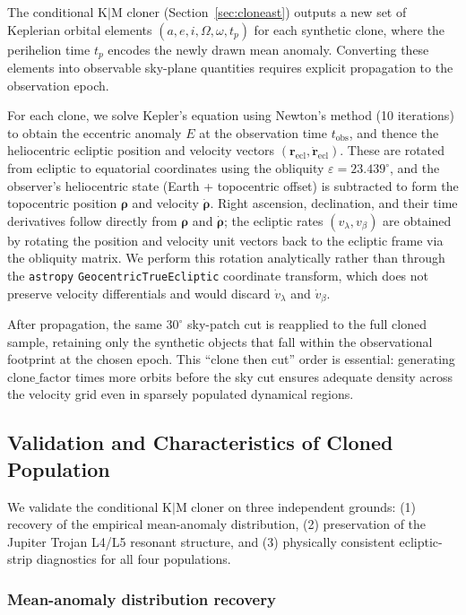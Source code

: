 \documentclass[linenumbers,trackchanges,twocolumn]{aastex701}
\begin{document}
The conditional K$|$M cloner (Section~\ref{sec:cloneast}) outputs a new set of Keplerian orbital elements $(a, e, i, \Omega, \omega, t_p)$ for each synthetic clone, where the perihelion time $t_p$ encodes the newly drawn mean anomaly.
Converting these elements into observable sky-plane quantities requires explicit propagation to the observation epoch.

For each clone, we solve Kepler's equation using Newton's method (10 iterations) to obtain the eccentric anomaly $E$ at the observation time $t_\mathrm{obs}$, and thence the heliocentric ecliptic position and velocity vectors $(\mathbf{r}_\mathrm{ecl}, \dot{\mathbf{r}}_\mathrm{ecl})$.
These are rotated from ecliptic to equatorial coordinates using the obliquity $\varepsilon = 23.439^\circ$, and the observer's heliocentric state (Earth + topocentric offset) is subtracted to form the topocentric position $\mathbf{\rho}$ and velocity $\dot{\mathbf{\rho}}$.
Right ascension, declination, and their time derivatives follow directly from $\mathbf{\rho}$ and $\dot{\mathbf{\rho}}$; the ecliptic rates $(v_\lambda, v_\beta)$ are obtained by rotating the position and velocity unit vectors back to the ecliptic frame via the obliquity matrix.
We perform this rotation analytically rather than through the \texttt{astropy} \texttt{GeocentricTrueEcliptic} coordinate transform, which does not preserve velocity differentials and would discard $\dot{v}_\lambda$ and $\dot{v}_\beta$.

After propagation, the same $30^\circ$ sky-patch cut is reapplied to the full cloned sample, retaining only the synthetic objects that fall within the observational footprint at the chosen epoch.
This ``clone then cut'' order is essential: generating $\mathrm{clone\_factor}$ times more orbits before the sky cut ensures adequate density across the velocity grid even in sparsely populated dynamical regions.


\subsection{Validation and Characteristics of Cloned Population}
\label{sec:clonepop}

We validate the conditional K$|$M cloner on three independent grounds: (1) recovery of the empirical mean-anomaly distribution, (2) preservation of the Jupiter Trojan L4/L5 resonant structure, and (3) physically consistent ecliptic-strip diagnostics for all four populations.

\subsubsection*{Mean-anomaly distribution recovery}
\end{document}
